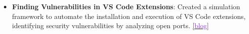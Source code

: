 \documentclass[10pt,a4paper,calibri]{moderncv}
\newcommand{\mediumspace}{\vspace{0.6em}}
\begin{document}
\begin{itemize}
	\item \textbf{Finding Vulnerabilities in VS Code Extensions}: Created a simulation framework to automate the installation and execution of VS Code extensions, identifying security vulnerabilities by analyzing open ports.
	      \href{https://github.com/prateekdceit06/VSCode-Extensions-Simulator}{[\textcolor{blueviolet}{blog}]}
\end{itemize}




\end{document}
